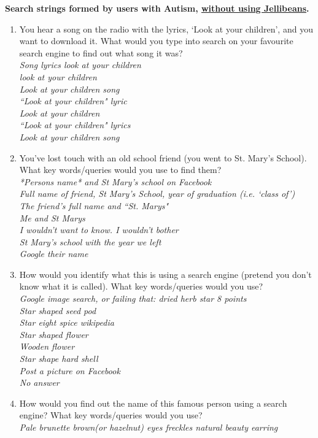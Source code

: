 \documentclass[a4paper, 11pt]{article}
\begin{document}
\textbf{Search strings formed by users with Autism, \underline{without using Jellibeans}. }
\begin{enumerate}\label{asdresponses}
\item{You hear a song on the radio with the lyrics, `Look at your children', and you want to download it. What would you type into search on your favourite search engine to find out what song it was?\\\textit{Song lyrics look at your children\\
look at your children\\
Look at your children song\\
``Look at your children" lyric\\
Look at your children\\
``Look at your children" lyrics\\
Look at your children song\\}}
\item{You've lost touch with an old school friend (you went to St. Mary's School). What key words/queries would you use to find them?\\\textit{*Persons name* and St Mary's school on Facebook\\Full name of friend, St Mary's School, year of graduation (i.e. `class of')\\
The friend's full name and ``St. Marys"\\
Me and St Marys\\
I wouldn't want to know. I wouldn't bother\\
St Mary's school with the year we left \\
Google their name}}
\item{How would you identify what this is using a search engine (pretend you don't know what it is called). What key words/queries would you use?\\\textit{Google image search, or failing that: dried herb star 8 points\\
Star shaped seed pod\\
Star eight spice wikipedia\\
Star shaped flower \\
Wooden flower\\
Star shape hard shell \\
Post a picture on Facebook\\
No answer}}
\item{How would you find out the name of this famous person using a search engine? What key words/queries would you use?\\\textit{Pale brunette brown(or hazelnut) eyes freckles natural beauty earring\\
}}
\end{enumerate}
\end{document}
